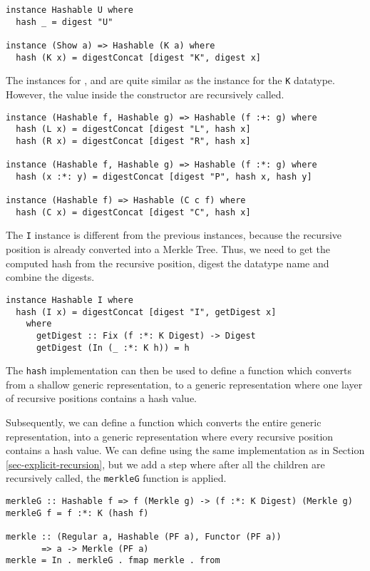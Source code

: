 \begin{verbatim}
instance Hashable U where
  hash _ = digest "U"

instance (Show a) => Hashable (K a) where
  hash (K x) = digestConcat [digest "K", digest x]
\end{verbatim}

The instances for \inlinehaskell{:+:}, \inlinehaskell{:*:} and  are quite similar as the instance for the \texttt{K} datatype. However, the value inside the constructor are recursively called.

\begin{verbatim}
instance (Hashable f, Hashable g) => Hashable (f :+: g) where
  hash (L x) = digestConcat [digest "L", hash x]
  hash (R x) = digestConcat [digest "R", hash x]

instance (Hashable f, Hashable g) => Hashable (f :*: g) where
  hash (x :*: y) = digestConcat [digest "P", hash x, hash y]

instance (Hashable f) => Hashable (C c f) where
  hash (C x) = digestConcat [digest "C", hash x]
\end{verbatim}

The \texttt{I} instance is different from the previous instances, because the recursive position is already converted into a Merkle Tree. Thus, we need to get the computed hash from the recursive position, digest the datatype name and combine the digests. 

\begin{verbatim}
instance Hashable I where
  hash (I x) = digestConcat [digest "I", getDigest x]
    where
      getDigest :: Fix (f :*: K Digest) -> Digest
      getDigest (In (_ :*: K h)) = h
\end{verbatim}

The \texttt{hash} implementation can then be used to define a function  which converts from a shallow generic representation, to a generic representation where one layer of recursive positions contains a hash value. 

Subsequently, we can define a function  which converts the entire generic representation, into a generic representation where every recursive position contains a hash value. We can define  using the same implementation as in Section \ref*{sec-explicit-recursion}, but we add a step where after all the children are recursively called, the \texttt{merkleG} function is applied. 

\begin{verbatim}
merkleG :: Hashable f => f (Merkle g) -> (f :*: K Digest) (Merkle g)
merkleG f = f :*: K (hash f)

merkle :: (Regular a, Hashable (PF a), Functor (PF a))
       => a -> Merkle (PF a)
merkle = In . merkleG . fmap merkle . from
\end{verbatim}

